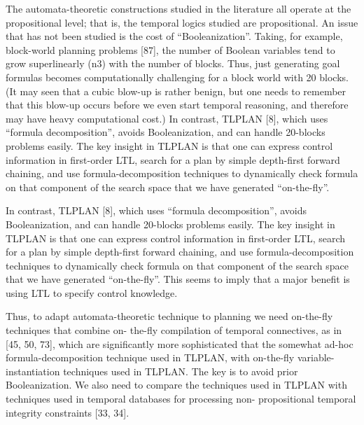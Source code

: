 The automata-theoretic constructions studied in the literature all operate at the propositional level; that is, the temporal logics studied are propositional. An issue that has not been studied is the cost of “Booleanization”. Taking, for example, block-world planning problems [87], the number of Boolean variables tend to grow superlinearly (n3) with the number of blocks. Thus, just generating goal formulas becomes computationally challenging for a block world with 20 blocks. (It may seen that a cubic blow-up is rather benign, but one needs to remember that this blow-up occurs before we even start temporal reasoning, and therefore may have heavy computational cost.) In contrast, TLPLAN [8], which uses “formula decomposition”, avoids Booleanization, and can handle 20-blocks problems easily. The key insight in TLPLAN is that one can express control information in first-order LTL, search for a plan by simple depth-first forward chaining, and use formula-decomposition techniques to dynamically check formula on that component of the search space that we have generated “on-the-fly”.

In contrast, TLPLAN [8], which uses “formula decomposition”, avoids Booleanization, and can handle 20-blocks problems easily. The key insight in TLPLAN is that one can express control information in first-order LTL, search for a plan by simple depth-first forward chaining, and use formula-decomposition techniques to dynamically check formula on that component of the search space that we have generated “on-the-fly”.
This seems to imply that a major benefit is using LTL to specify control knowledge. 

Thus, to adapt automata-theoretic technique to planning we need on-the-fly techniques that combine on- the-fly compilation of temporal connectives, as in [45, 50, 73], which are significantly more sophisticated that the somewhat ad-hoc formula-decomposition technique used in TLPLAN, with on-the-fly variable- instantiation techniques used in TLPLAN. The key is to avoid prior Booleanization. We also need to compare the techniques used in TLPLAN with techniques used in temporal databases for processing non- propositional temporal integrity constraints [33, 34].



